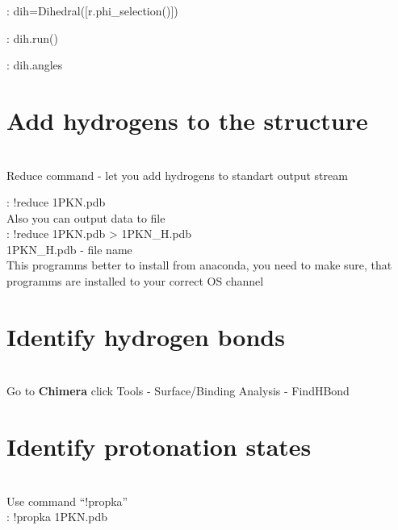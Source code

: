 \documentclass{article}
\begin{document}
    : dih=Dihedral([r.phi\_selection()])
    
    : dih.run()
    
    : dih.angles \\
    







\section{Add hydrogens to the structure} \\

    Reduce command - let you add hydrogens to standart output stream 

: !reduce 1PKN.pdb \\

Also you can output data to file \\

: !reduce 1PKN.pdb > 1PKN\_H.pdb \\

1PKN\_H.pdb - file name \\

This programms better to install from anaconda, you need to make sure, that programms are installed to your correct OS channel \\









\section{Identify hydrogen bonds}\\


Go to \textbf{Chimera} click Tools - Surface/Binding Analysis - FindHBond \\







\section{Identify protonation states} \\

Use command ``!propka'' \\

: !propka 1PKN.pdb 
\end{document}
